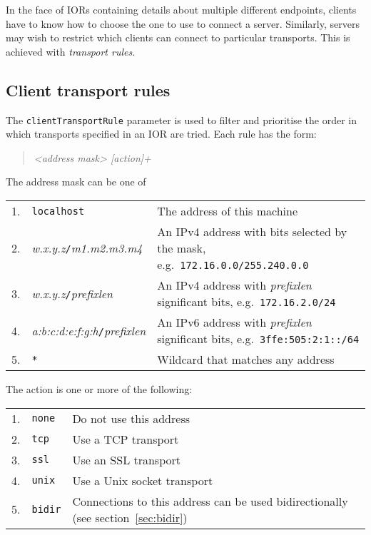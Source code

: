\documentclass[11pt,twoside,a4paper]{book}
\newcommand{\code}[1]{\texttt{#1}}
\newcommand{\term}[1]{\textit{#1}}
\begin{document}
In the face of IORs containing details about multiple different
endpoints, clients have to know how to choose the one to use to
connect a server. Similarly, servers may wish to restrict which
clients can connect to particular transports. This is achieved with
\term{transport rules}.


\subsection{Client transport rules}
\label{sec:clientRule}

The \code{clientTransportRule} parameter is used to filter and
prioritise the order in which transports specified in an IOR are
tried. Each rule has the form:

\begin{quote}
\textit{<address mask> [action]+}
\end{quote}

\noindent The address mask can be one of

\vspace{\baselineskip}

\begin{tabular}{llp{}}
1. & \code{localhost} & The address of this machine\\

2. & \textit{w.x.y.z}\code{/}\textit{m1.m2.m3.m4} & An IPv4 address
     with bits selected by the mask, e.g.\
     \code{172.16.0.0/255.240.0.0}\\

3. & \textit{w.x.y.z}\code{/}\textit{prefixlen} & An IPv4 address with
     \textit{prefixlen} significant bits, e.g.\
     \code{172.16.2.0/24}\\

4. & \textit{a:b:c:d:e:f:g:h}\code{/}\textit{prefixlen} & An IPv6
     address with \textit{prefixlen} significant bits, e.g.\
     \code{3ffe:505:2:1::/64}\\

5. & \code{*} & Wildcard that matches any address\\
\end{tabular}

\vspace{\baselineskip}

\noindent The action is one or more of the following:

\vspace{\baselineskip}

\begin{tabular}{llp{}}
1. & \code{none} & Do not use this address\\
2. & \code{tcp}  & Use a TCP transport\\
3. & \code{ssl}  & Use an SSL transport\\
4. & \code{unix} & Use a Unix socket transport\\
5. & \code{bidir}& Connections to this address can be used
                   bidirectionally (see section~\ref{sec:bidir})\\
\end{tabular}
\end{document}
